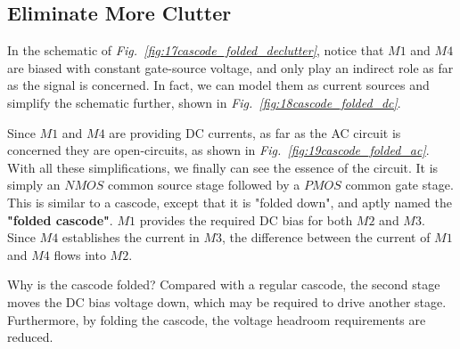 \subsection{Eliminate More Clutter}
In the schematic of \emph{Fig.~\ref{fig:17cascode_folded_declutter}}, notice that $M1$ and $M4$ are biased with constant gate-source voltage, and only play an indirect role as far as the signal is concerned.  In fact, we can model them as current sources and simplify the schematic further, shown in \emph{Fig.~\ref{fig:18cascode_folded_dc}}.

Since $M1$ and $M4$ are providing DC currents, as far as the AC circuit is concerned they are open-circuits, as shown in \emph{Fig.~\ref{fig:19cascode_folded_ac}}.  With all these simplifications, we finally can see the essence of the circuit. It is simply an $NMOS$ common source stage followed by a $PMOS$ common gate stage.  This is similar to a cascode, except that it is "folded down", and aptly named the \textbf{"folded cascode"}.  $M1$ provides the required DC bias for both $M2$ and $M3$.  Since $M4$ establishes the current in $M3$, the difference between the current of $M1$ and $M4$ flows into $M2$.

Why is the cascode folded?  Compared with a regular cascode, the second stage moves the DC bias voltage down, which may be required to drive another stage.  Furthermore, by folding the cascode, the voltage headroom requirements are reduced.

